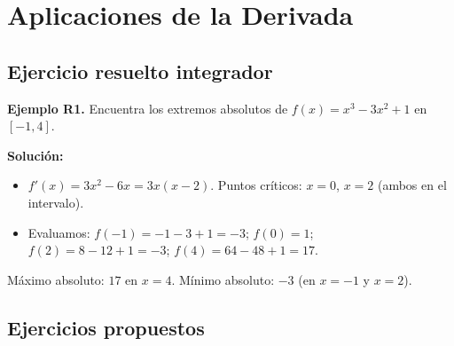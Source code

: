 \documentclass[12pt, letterpaper]{article}
\begin{document}
\newpage

\section{Aplicaciones de la Derivada}

\subsection{Ejercicio resuelto integrador}

\textbf{Ejemplo R1.} Encuentra los extremos absolutos de $f(x) = x^3 - 3x^2 + 1$ en $[-1, 4]$.

\begin{cuadrosolucion}
  \textbf{Solución:}
  \begin{itemize}
    \item $f'(x) = 3x^2 - 6x = 3x(x - 2)$. Puntos críticos: $x = 0$, $x = 2$ (ambos en el intervalo).
    \item Evaluamos: $f(-1) = -1 - 3 + 1 = -3$; $f(0) = 1$; $f(2) = 8 - 12 + 1 = -3$; $f(4) = 64 - 48 + 1 = 17$.
  \end{itemize}
  Máximo absoluto: $17$ en $x = 4$. Mínimo absoluto: $-3$ (en $x = -1$ y $x = 2$).
\end{cuadrosolucion}

\subsection{Ejercicios propuestos}
\end{document}
